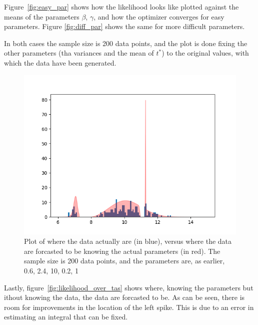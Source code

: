 \documentclass{article}
\begin{document}
Figure~\ref{fig:easy_par} shows how the likelihood looks like plotted against the means of the parameters \(\beta\), \(\gamma\), and how the optimizer converges for easy parameters.
Figure \autoref{fig:diff_par} shows the same for more difficult parameters.

In both cases the sample size is 200 data points, and the plot is done fixing the other parameters (tha variances and the mean of \(t^*\)) to the original values, with which the data have been generated.

\begin{figure}
  \centering
  \includegraphics[width=.8\textwidth]{img/likelihood_over_ta}
  \caption{Plot of where the data actually are (in blue), versus where the data are forcasted to be knowing the actual parameters (in red). The sample size is 200 data points, and the parameters are, as earlier, 0.6, 2.4, 10, 0.2, 1}
  \label{fig:likelihood_over_tas}
\end{figure}

Lastly, figure~\autoref{fig:likelihood_over_tas} shows where, knowing the parameters but ithout knowing the data, the data are forcasted to be.
As can be seen, there is room for improvements in the location of the left spike. This is due to an error in estimating an integral that can be fixed.
\end{document}
